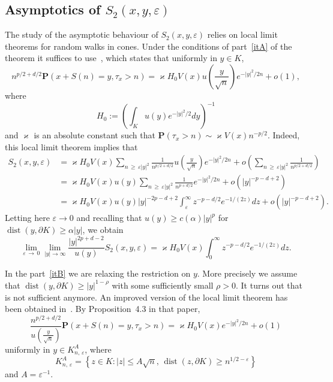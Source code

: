 \documentclass[10pt]{amsart}
\theoremstyle{definition}\newtheorem{defi}[theo]{Definition}\newtheorem{rema}[theo]{Remark}\newtheorem{exam}[theo]{Example}\newtheorem{exem}[theo]{Example}\newtheorem{nota}[theo]{Notation}
\DeclareMathOperator{\dist}{dist}
\newcommand{\pr}{\mathbf{P}}
\renewcommand{\epsilon}{\varepsilon}
\renewcommand{\ge}{\geqslant}
\renewcommand{\leq}{\leqslant}
\renewcommand{\geq}{\geqslant}
\begin{document}
\subsection*{Asymptotics of \texorpdfstring{$S_2(x,y,\varepsilon)$}{S2(x,y, varepsilon)}}
The study of the asymptotic behaviour of $S_2(x,y,\varepsilon)$ relies on local limit theorems for random walks in cones. Under the conditions of part~\eqref{itA} of the theorem it suffices to use~\cite[Theorem~5]{DeWa-15}, which states that uniformly in $y\in K$,
\begin{equation}\label{eq:llt}
n^{p/2+d/2}\pr\left(x+S(n)=y,\tau_x>n\right)=
\varkappa H_0 V(x)u\left(\frac{y}{\sqrt{n}}\right)e^{-| y|^2/2n}+o(1),
\end{equation}
where
\[
H_0:=\left(\int_K u(y)e^{-|y|^2/2}dy\right)^{-1}
\]
and $\varkappa$ is an absolute constant such that $\pr(\tau_x>n)\sim\varkappa V(x)n^{-p/2}$. Indeed, this local limit theorem implies that
\begin{align*}
S_2(x,y,\varepsilon) &=\varkappa H_0 V(x)\sum_{n\,\ge\,\varepsilon|y|^2}\frac{1}{n^{p/2+d/2}} u\left(\frac{y}{\sqrt{n}}\right)e^{-|y|^2/2n}+ o\left(\sum_{n\,\ge\,\varepsilon|y|^2}\frac{1}{n^{p/2+d/2}}\right)\\
&=\varkappa H_0 V(x)u(y)\sum_{n\,\ge\,\varepsilon|y|^2}\frac{1}{n^{p+d/2}}e^{-|y|^2/2n}+ o\left(|y|^{-p-d+2}\right)\\
&=\varkappa H_0 V(x)u(y)|y|^{-2p-d+2}\int_\varepsilon^\infty z^{-p-d/2}e^{-1/(2z)}dz+ o\left(|y|^{-p-d+2}\right).
\end{align*}
Letting here $\varepsilon\to0$ and recalling that $u(y)\ge c(\alpha)|y|^p$ for $\dist(y,\partial K)\ge \alpha|y|$, we obtain
\begin{equation}\label{lim_S_2}
\lim_{\varepsilon\,\to\,0}\lim_{|y|\to\infty}\frac{|y|^{2p+d-2}}{u(y)}S_2(x,y,\varepsilon) =\varkappa H_0 V(x)\int_0^\infty z^{-p-d/2}e^{-1/(2z)}dz.
\end{equation}

In the part~\eqref{itB} we are relaxing the restriction on $y$. More precisely we assume that $\dist(y,\partial K)\ge |y|^{1-\rho}$ with some sufficiently small $\rho>0$. It turns out that~\cite[Theorem~5]{DeWa-15} is not sufficient anymore. An improved version of the local limit theorem has been obtained in~\cite{RaTa-20}. By Proposition~4.3 in that paper,
\[
\frac{n^{p/2+d/2}}{u\left(\frac{y}{\sqrt{n}}\right)}\pr\left(x+S(n)=y,\tau_x>n\right)=
\varkappa H_0 V(x)e^{-| y|^2/2n}+o(1)
\]
uniformly in $y\in K_{n,\,\epsilon}^{A}$, where
\begin{equation}\label{eq:def_K_n,e,A}
K_{n,\,\epsilon}^{A}=\left\{z\in K: | z| \leq A\sqrt{n},\, \dist(z,\partial K)\geq n^{1/2-\epsilon}\right\}
\end{equation}
and $A=\varepsilon^{-1}$.
\end{document}
